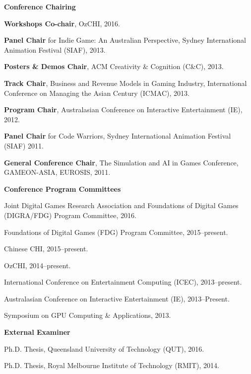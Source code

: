 \documentclass[10pt,a4paper]{article}
\renewenvironment{itemize}{
    \begin{list}{}{
            \setlength{\leftmargin}{1.5em}
            \setlength{\itemsep}{0.25em}
            \setlength{\parskip}{0pt}
            \setlength{\parsep}{0.25em}
        }
        }{
    \end{list}
}
\begin{document}
\begin{itemize}

    \item \textbf{Conference Chairing}
        \begin{itemize}
            \item \textbf{Workshops Co-chair}, OzCHI, 2016.
            \item \textbf{Panel Chair} for Indie Game: An Australian Perspective, Sydney International Animation Festival (SIAF), 2013.
            \item \textbf{Posters \& Demos Chair}, ACM Creativity \& Cognition (C\&C), 2013.
            \item \textbf{Track Chair}, Business and Revenue Models in Gaming Industry, International Conference on Managing the Asian Century (ICMAC), 2013.
            \item \textbf{Program Chair}, Australasian Conference on Interactive Entertainment (IE), 2012.
            \item \textbf{Panel Chair} for Code Warriors, Sydney International Animation Festival (SIAF) 2011.
            \item \textbf{General Conference Chair}, The Simulation and AI in Games Conference, GAMEON-ASIA, EUROSIS, 2011.
        \end{itemize}

    \item \textbf{Conference Program Committees}
        \begin{itemize}
            \item Joint Digital Games Research Association and Foundations of Digital Games (DIGRA/FDG) Program Committee, 2016.
            \item Foundations of Digital Games (FDG) Program Committee, 2015--present.
            \item Chinese CHI, 2015--present.
            \item OzCHI, 2014--present.
            \item International Conference on Entertainment Computing (ICEC), 2013--present.
            \item Australasian Conference on Interactive Entertainment (IE), 2013--Present.
            \item Symposium on GPU Computing \& Applications, 2013.
        \end{itemize}

    \item \textbf{External Examiner}
        \begin{itemize}
            \item Ph.D. Thesis, Queensland University of Technology (QUT), 2016.
            \item Ph.D. Thesis, Royal Melbourne Institute of Technology (RMIT), 2014.
        \end{itemize}


\end{itemize}
\end{document}
